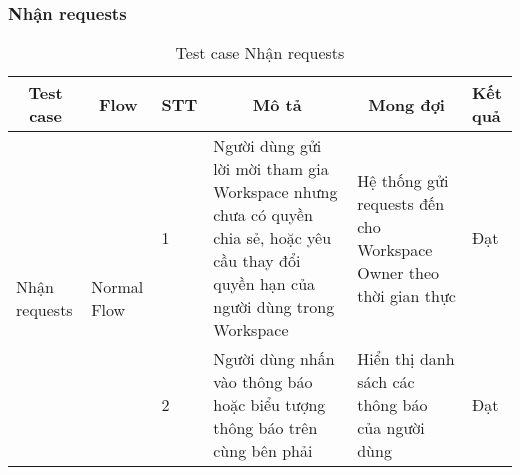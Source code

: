 \subsubsection{Nhận requests}
\begin{table}[H]
\begin{tabular}{|p{2cm}|p{2.5cm}|p{0.5cm}|p{4cm}|p{4cm}|p{1cm}|}
\hline
\multicolumn{1}{|c|}{\textbf{Test case}} & \multicolumn{1}{c|}{\textbf{Flow}} & \textbf{STT} & \multicolumn{1}{c|}{\textbf{Mô tả}} & \multicolumn{1}{c|}{\textbf{Mong đợi}} & \textbf{Kết quả} \\ \hline
\multirow{2}{*}{Nhận requests} & \multirow{2}{*}{Normal Flow} & 1 & Người dùng gửi lời mời tham gia Workspace nhưng chưa có quyền chia sẻ, hoặc yêu cầu thay đổi quyền hạn của người dùng trong Workspace & Hệ thống gửi requests đến cho Workspace Owner theo thời gian thực & Đạt \\ \cline{3-6} 
 &  & 2 & Người dùng nhấn vào thông báo hoặc biểu tượng thông báo trên cùng bên phải & Hiển thị danh sách các thông báo của người dùng & Đạt \\ \hline
\end{tabular}
\caption{Test case Nhận requests}
\end{table}